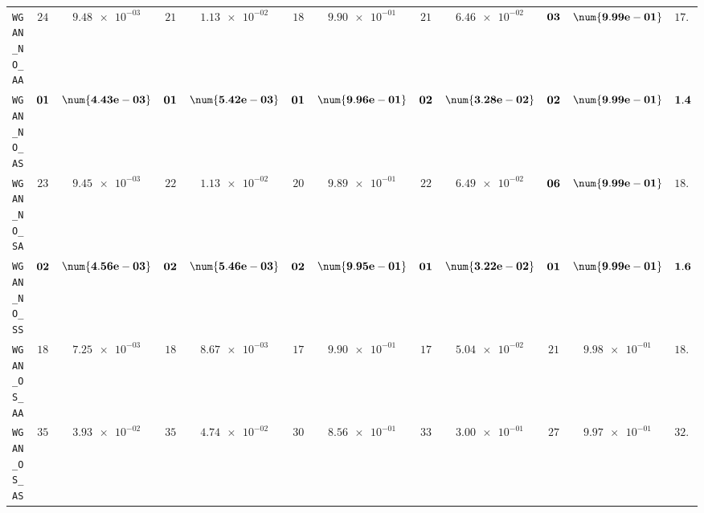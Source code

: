 \begin{xltabular}{\textwidth}{l||cC|cC|cC|cC|cC||c}
	\texttt{WGAN\_NO\_AA} & $ 24$ & $ \num{9.48e-03}$ & $ 21$ & $ \num{1.13e-02}$ & $ 18$ & $ \num{9.90e-01}$ & $ 21$ & $ \num{6.46e-02}$ & $\bf 03$ & $\bf \num{9.99e-01}$ & $ 17.4$  \\
	\texttt{WGAN\_NO\_AS} & $\bf 01$ & $\bf \num{4.43e-03}$ & $\bf 01$ & $\bf \num{5.42e-03}$ & $\bf 01$ & $\bf \num{9.96e-01}$ & $\bf 02$ & $\bf \num{3.28e-02}$ & $\bf 02$ & $\bf \num{9.99e-01}$ & $\bf 1.4$  \\
	\texttt{WGAN\_NO\_SA} & $ 23$ & $ \num{9.45e-03}$ & $ 22$ & $ \num{1.13e-02}$ & $ 20$ & $ \num{9.89e-01}$ & $ 22$ & $ \num{6.49e-02}$ & $\bf 06$ & $\bf \num{9.99e-01}$ & $ 18.6$  \\
	\texttt{WGAN\_NO\_SS} & $\bf 02$ & $\bf \num{4.56e-03}$ & $\bf 02$ & $\bf \num{5.46e-03}$ & $\bf 02$ & $\bf \num{9.95e-01}$ & $\bf 01$ & $\bf \num{3.22e-02}$ & $\bf 01$ & $\bf \num{9.99e-01}$ & $\bf 1.6$  \\
	\texttt{WGAN\_OS\_AA} & $ 18$ & $ \num{7.25e-03}$ & $ 18$ & $ \num{8.67e-03}$ & $ 17$ & $ \num{9.90e-01}$ & $ 17$ & $ \num{5.04e-02}$ & $ 21$ & $ \num{9.98e-01}$ & $ 18.2$  \\
	\texttt{WGAN\_OS\_AS} & $ 35$ & $ \num{3.93e-02}$ & $ 35$ & $ \num{4.74e-02}$ & $ 30$ & $ \num{8.56e-01}$ & $ 33$ & $ \num{3.00e-01}$ & $ 27$ & $ \num{9.97e-01}$ & $ 32.0$  \\

\end{xltabular}
